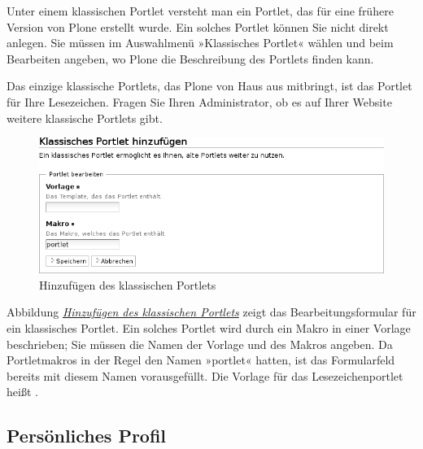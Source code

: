 \documentclass[a4paper,12pt,ngerman]{manual}
\begin{document}
Unter einem klassischen Portlet versteht man ein Portlet, das für eine
frühere Version von Plone erstellt wurde. Ein solches Portlet können
Sie nicht direkt anlegen. Sie müssen im Auswahlmenü »Klassisches
Portlet« wählen und beim Bearbeiten angeben, wo Plone die Beschreibung
des Portlets finden kann.

Das einzige klassische Portlets, das Plone von Haus aus mitbringt, ist das
Portlet für Ihre Lesezeichen. Fragen Sie Ihren Administrator, ob es auf Ihrer
Website weitere klassische Portlets gibt.
\hypertarget{fig-klassisches-portlet-hinzufuegen}{}\begin{figure}[htbp]
\centering

\includegraphics{klassisches-portlet-hinzufuegen.png}
\caption{Hinzufügen des klassischen Portlets}\end{figure}

Abbildung \hyperlink{fig-klassisches-portlet-hinzufuegen}{\emph{Hinzufügen des klassischen Portlets}}
zeigt das Bearbeitungsformular für ein klassisches Portlet. Ein solches
Portlet wird durch ein Makro in einer Vorlage beschrieben; Sie müssen die
Namen der Vorlage und des Makros angeben. Da Portletmakros in der Regel den
Namen »portlet« hatten, ist das Formularfeld bereits mit diesem Namen
vorausgefüllt. Die Vorlage für das Lesezeichenportlet heißt
.
\hypertarget{sec-profil}{}

\subsection{Persönliches Profil}
\end{document}
